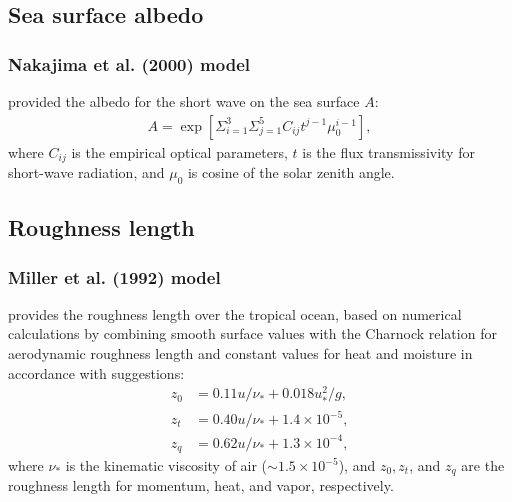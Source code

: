 \subsection{Sea surface albedo}
\subsubsection{Nakajima et al. (2000) model}
\citet{nakajima_2000} provided the albedo for the short wave on the sea surface $A$:
\begin{align}
  A = \exp \left[ \Sigma_{i=1}^{3} \Sigma_{j=1}^{5} C_{ij} t^{j-1} \mu_0^{i-1} \right],
\end{align}
where
$C_{ij}$ is the empirical optical parameters,
$t$ is the flux transmissivity for short-wave radiation,
and $\mu_0$ is cosine of the solar zenith angle.


\subsection{Roughness length}
\subsubsection{Miller et al. (1992) model}
\citet{miller_1992} provides the roughness length over the tropical ocean,
based on numerical calculations by combining smooth surface values
with the Charnock relation for aerodynamic roughness length
and constant values for heat and moisture in accordance with \citet{Smith_1988,Smith_1989} suggestions:
\begin{align}
  z_0 &= 0.11u/\nu_* + 0.018u_*^2/g, \label{eq: z_0} \\
  z_t &= 0.40u/\nu_* + 1.4 \times 10^{-5}, \label{eq: z_t} \\
  z_q &= 0.62u/\nu_* + 1.3 \times 10^{-4}, \label{eq: z_q}
\end{align}
where $\nu_*$ is the kinematic viscosity of air ($\sim 1.5 \times 10^{-5}$), and $z_0, z_t$,
and $z_q$ are the roughness length for momentum, heat, and vapor, respectively.

